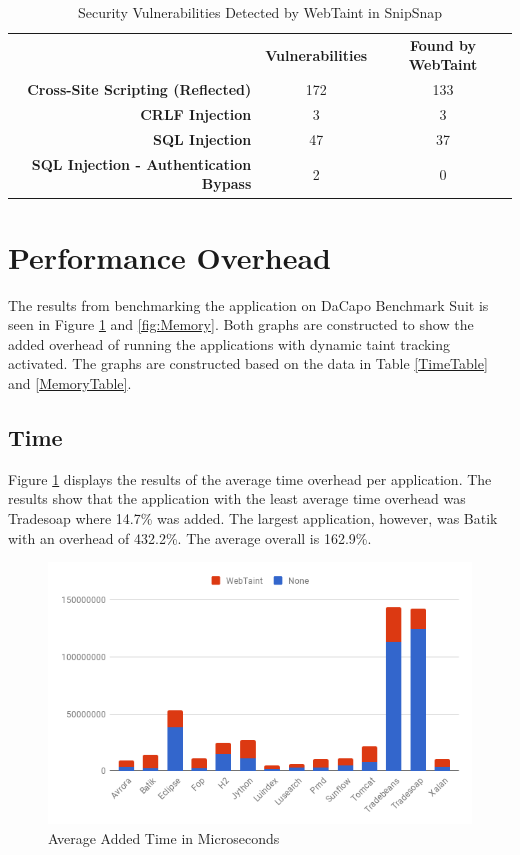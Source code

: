 \begin{table}[H]
  \centering
  \caption{Security Vulnerabilities Detected by WebTaint in SnipSnap}
  \label{table:SnipSnapTable}
  \begin{tabular}{rcc}
    & \textbf{Vulnerabilities} & \textbf{Found by WebTaint} \\
    \textbf{Cross-Site Scripting (Reflected)}      & 172           & 133  \\
    \textbf{CRLF Injection}                        & 3             & 3    \\
    \textbf{SQL Injection}                         & 47            & 37   \\
    \textbf{SQL Injection - Authentication Bypass} & 2             & 0       
  \end{tabular}
\end{table}



\section{Performance Overhead}
\label{Performance}
The results from benchmarking the application on DaCapo Benchmark Suit \parencite{dacapo} is seen in Figure \ref{fig:Time} and \ref{fig:Memory}. Both graphs are constructed to show the added overhead of running the applications with dynamic taint tracking activated. The graphs are constructed based on the data in Table \ref{TimeTable} and \ref{MemoryTable}.



\subsection{Time}
Figure \ref{fig:Time} displays the results of the average time overhead per application. The results show that the application with the least average time overhead was Tradesoap where 14.7\% was added. The largest application, however, was Batik with an overhead of 432.2\%. The average overall is 162.9\%.

\begin{figure}[H]
    \centering
    \includegraphics[width=\textwidth]{images/Time.png}
    \caption{Average Added Time in Microseconds}
    \label{fig:Time}
\end{figure}



